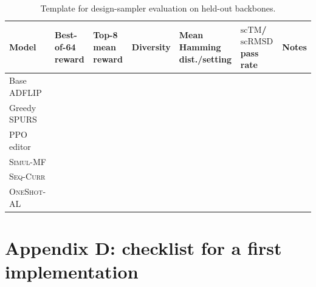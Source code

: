 \documentclass[11pt]{article}
\newcommand{\scTM}{\ensuremath{\mathrm{scTM}}}
\newcommand{\scRMSD}{\ensuremath{\mathrm{scRMSD}}}
\newcommand{\methodI}{\textsc{Simul-MF}}
\newcommand{\methodII}{\textsc{Seq-Curr}}
\newcommand{\methodIII}{\textsc{OneShot-AL}}
\begin{document}
	\begin{table}[H]
		\centering
		\small
		\caption{Template for design-sampler evaluation on held-out backbones.}
		\begin{tabularx}{\textwidth}{>{\raggedright\arraybackslash}p{} *{5}{>{\centering\arraybackslash}p{}} X}
			\toprule
			Model & \shortstack{Best-of-64\\reward} & \shortstack{Top-8 mean\\reward} & Diversity & \shortstack{Mean Hamming\\dist./setting} & \shortstack{\scTM/\scRMSD\\pass rate} & Notes \\
			\midrule
			Base ADFLIP &  &  &  &  &  &  \\
			Greedy SPURS &  &  &  &  &  &  \\
			PPO editor &  &  &  &  &  &  \\
			\methodI{} &  &  &  &  &  &  \\
			\methodII{} &  &  &  &  &  &  \\
			\methodIII{} &  &  &  &  &  &  \\
			\bottomrule
		\end{tabularx}
	\end{table}
	
	\section{Appendix D: checklist for a first implementation}
	
\end{document}
